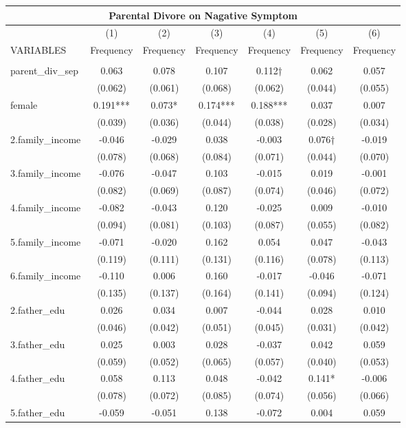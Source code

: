 \documentclass[]{article}
\begin{document}
\begin{tabular}{lcccccc}
\multicolumn{7}{c}{Parental Divore on Nagative Symptom} \\ \hline
 & (1) & (2) & (3) & (4) & (5) & (6) \\
VARIABLES & Frequency & Frequency & Frequency & Frequency & Frequency & Frequency \\ \hline
 &  &  &  &  &  &  \\
parent\_div\_sep & 0.063 & 0.078 & 0.107 & 0.112† & 0.062 & 0.057 \\
 & (0.062) & (0.061) & (0.068) & (0.062) & (0.044) & (0.055) \\
female & 0.191*** & 0.073* & 0.174*** & 0.188*** & 0.037 & 0.007 \\
 & (0.039) & (0.036) & (0.044) & (0.038) & (0.028) & (0.034) \\
2.family\_income & -0.046 & -0.029 & 0.038 & -0.003 & 0.076† & -0.019 \\
 & (0.078) & (0.068) & (0.084) & (0.071) & (0.044) & (0.070) \\
3.family\_income & -0.076 & -0.047 & 0.103 & -0.015 & 0.019 & -0.001 \\
 & (0.082) & (0.069) & (0.087) & (0.074) & (0.046) & (0.072) \\
4.family\_income & -0.082 & -0.043 & 0.120 & -0.025 & 0.009 & -0.010 \\
 & (0.094) & (0.081) & (0.103) & (0.087) & (0.055) & (0.082) \\
5.family\_income & -0.071 & -0.020 & 0.162 & 0.054 & 0.047 & -0.043 \\
 & (0.119) & (0.111) & (0.131) & (0.116) & (0.078) & (0.113) \\
6.family\_income & -0.110 & 0.006 & 0.160 & -0.017 & -0.046 & -0.071 \\
 & (0.135) & (0.137) & (0.164) & (0.141) & (0.094) & (0.124) \\
2.father\_edu & 0.026 & 0.034 & 0.007 & -0.044 & 0.028 & 0.010 \\
 & (0.046) & (0.042) & (0.051) & (0.045) & (0.031) & (0.042) \\
3.father\_edu & 0.025 & 0.003 & 0.028 & -0.037 & 0.042 & 0.059 \\
 & (0.059) & (0.052) & (0.065) & (0.057) & (0.040) & (0.053) \\
4.father\_edu & 0.058 & 0.113 & 0.048 & -0.042 & 0.141* & -0.006 \\
 & (0.078) & (0.072) & (0.085) & (0.074) & (0.056) & (0.066) \\
5.father\_edu & -0.059 & -0.051 & 0.138 & -0.072 & 0.004 & 0.059 \\

\end{tabular}
\end{document}
